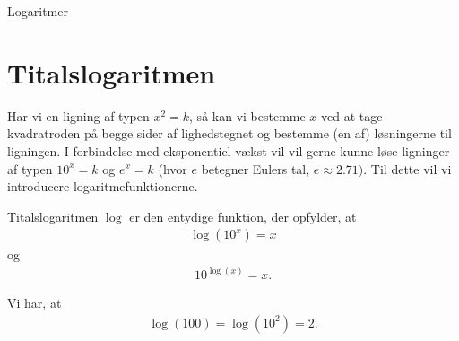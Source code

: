 
\begin{center}
\Huge
Logaritmer
\end{center}

\section*{Titalslogaritmen}
Har vi en ligning af typen $x^2 = k$, så kan vi bestemme $x$ ved at tage kvadratroden på begge sider af lighedstegnet og bestemme (en af) løsningerne til ligningen. I forbindelse med eksponentiel vækst
vil vil gerne kunne løse ligninger af typen $10^x = k$ og $e^x=k$  (hvor $e$ betegner Eulers tal, $e \approx 2.71)$. Til dette vil vi introducere logaritmefunktionerne. 

\begin{defn}[Titalslogaritmen]
	Titalslogaritmen $\log$ er den entydige funktion, der opfylder, at 
	\begin{align*}
		\log(10^x) = x
	\end{align*}
	og 
	\begin{align*}
		10^{\log(x)} = x.
	\end{align*}
\end{defn}

\begin{exa}
	Vi har, at 
	\begin{align*}
		\log(100) = \log(10^2) = 2.
	\end{align*}
\end{exa}

